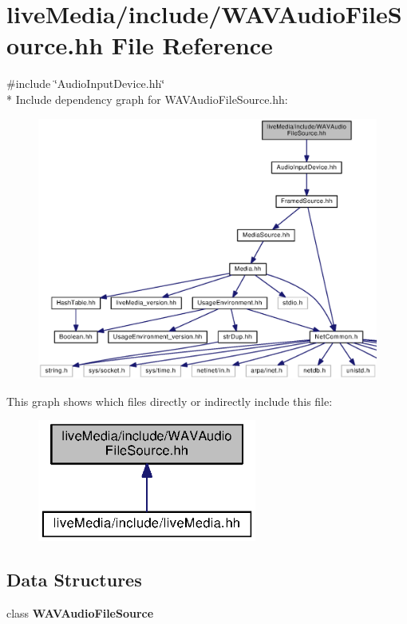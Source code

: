 \section{live\+Media/include/\+W\+A\+V\+Audio\+File\+Source.hh File Reference}
\label{WAVAudioFileSource_8hh}
{\ttfamily \#include \char`\"{}Audio\+Input\+Device.\+hh\char`\"{}}\\*
Include dependency graph for W\+A\+V\+Audio\+File\+Source.\+hh\+:
\nopagebreak
\begin{figure}[H]
\begin{center}
\leavevmode
\includegraphics[width=350pt]{WAVAudioFileSource_8hh__incl}
\end{center}
\end{figure}
This graph shows which files directly or indirectly include this file\+:
\nopagebreak
\begin{figure}[H]
\begin{center}
\leavevmode
\includegraphics[width=204pt]{WAVAudioFileSource_8hh__dep__incl}
\end{center}
\end{figure}
\subsection*{Data Structures}
\begin{DoxyCompactItemize}
\item 
class {\bf W\+A\+V\+Audio\+File\+Source}
\end{DoxyCompactItemize}
